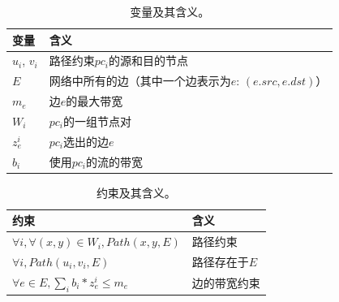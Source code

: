 \documentclass{ctexart}
\begin{document}
\begin{table}[]
\begin{tabular}{l|l}
变量     & 含义                                                             \\ \hline
$u_i$, $v_i$ & 路径约束$pc_i$的源和目的节点                            \\ 
$E$          & 网络中所有的边（其中一个边表示为$e$: $(e.src, e.dst)$）                       \\
$m_e$        & 边$e$的最大带宽                                            \\
$W_i$        &  $pc_i$的一组节点对\\
$z^i_e$      &  $pc_i$选出的边$e$\\
$b_i$          & 使用$pc_i$的流的带宽                            
\end{tabular}
\caption{变量及其含义。}
\label{table:variables}
\end{table}


\begin{table}[]
\begin{tabular}{l|l}
约束                                        & 含义                               \\ \hline
$\forall i, \forall (x, y) \in W_i, Path(x, y, E)$                    & 路径约束                  \\
$\forall i, Path(u_i, v_i, E)$      & 路径存在于$E$     \\
$\forall e \in E, \sum_ib_i*z^i_e \le m_e$   & 边的带宽约束
\end{tabular}
\caption{约束及其含义。}
\label{table:constraints}
\end{table}
\end{document}
